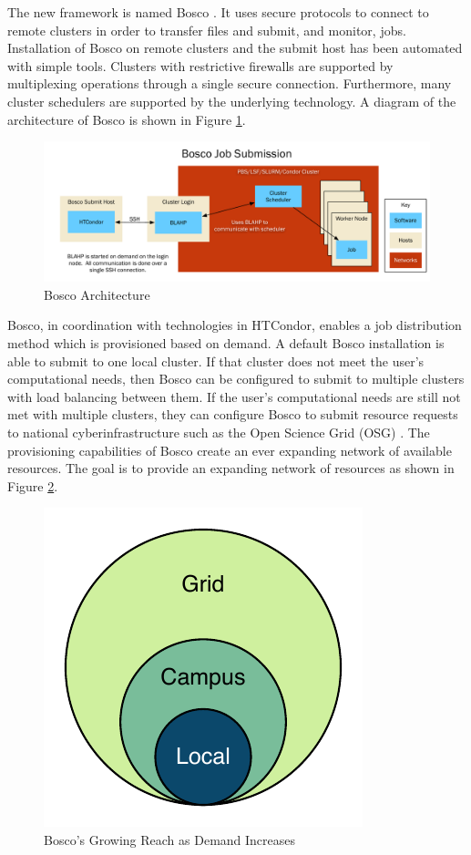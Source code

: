 The new framework is named Bosco \cite{weitzel2014accessing}.  It uses secure protocols to connect to remote clusters in order to transfer files and submit, and monitor, jobs.  Installation of Bosco on remote clusters and the submit host has been automated with simple tools.  Clusters with restrictive firewalls are supported by multiplexing operations through a single secure connection.  Furthermore, many cluster schedulers are supported by the underlying technology.  A diagram of the architecture of Bosco is shown in Figure \ref{fig:introboscoarch}.

\begin{figure}[h!t]
	\centering
	\includegraphics[width=\textwidth]{images/ArchitectureGraph1.pdf}
	\caption{Bosco Architecture}
	\label{fig:introboscoarch}
\end{figure}

Bosco, in coordination with technologies in HTCondor, enables a job distribution method which is provisioned based on demand.  A default Bosco installation is able to submit to one local cluster.  If that cluster does not meet the user's computational needs, then Bosco can be configured to submit to multiple clusters with load balancing between them.  If the user's computational needs are still not met with multiple clusters, they can configure Bosco to submit resource requests to national cyberinfrastructure such as the Open Science Grid (OSG) \cite{pordes2007open}.  The provisioning capabilities of Bosco create an ever expanding network of available resources. The goal is to provide an expanding network of resources as shown in Figure \ref{fig:boscogrowing}.

\begin{figure}[h!t]
	\centering
	\includegraphics{images/BoscoGrowing.pdf}
	\caption{Bosco's Growing Reach as Demand Increases}
	\label{fig:boscogrowing}
\end{figure}

